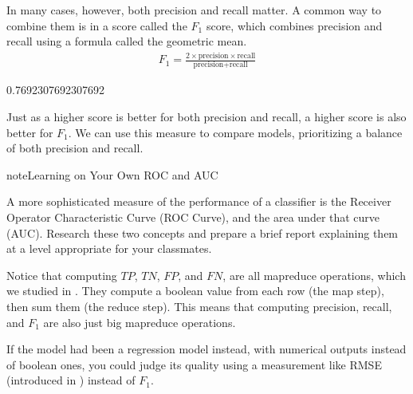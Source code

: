 \documentclass[letterpaper,10pt,english]{jupyterBook}
\begin{document}
\sphinxAtStartPar
In many cases, however, both precision and recall matter.  A common way to combine them is in a score called the \(F_1\) score, which combines precision and recall using a formula called the geometric mean.
\begin{equation*}
\begin{split}F_1=\frac{2\times\text{precision}\times\text{recall}}{\text{precision}+\text{recall}}\end{split}
\end{equation*}
\begin{sphinxVerbatim}[commandchars=\\\{\}]
            
\end{sphinxVerbatim}

\begin{sphinxVerbatim}[commandchars=\\\{\}]
0.7692307692307692
\end{sphinxVerbatim}

\sphinxAtStartPar
Just as a higher score is better for both precision and recall, a higher score is also better for \(F_1\).  We can use this measure to compare models, prioritizing a balance of both precision and recall.

\begin{sphinxadmonition}{note}{Learning on Your Own \sphinxhyphen{} ROC and AUC}

\sphinxAtStartPar
A more sophisticated measure of the performance of a classifier is the Receiver Operator Characteristic Curve (ROC Curve), and the area under that curve (AUC).  Research these two concepts and prepare a brief report explaining them at a level appropriate for your classmates.
\end{sphinxadmonition}

\sphinxAtStartPar
Notice that computing \(TP\), \(TN\), \(FP\), and \(FN\), are all map\sphinxhyphen{}reduce operations, which we studied in {\hyperref[\detokenize{chapter-11-processing-rows::doc}]{}}.  They compute a boolean value from each row (the map step), then sum them (the reduce step).  This means that computing precision, recall, and \(F_1\) are also just big map\sphinxhyphen{}reduce operations.

\sphinxAtStartPar
If the model had been a regression model instead, with numerical outputs instead of boolean ones, you could judge its quality using a measurement like RMSE (introduced in {\hyperref[\detokenize{chapter-11-processing-rows::doc}]{}}) instead of \(F_1\).
\end{document}
